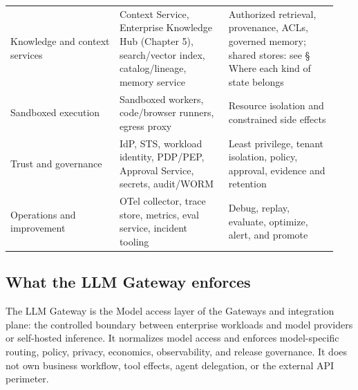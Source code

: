 \begin{longtable}{@{}Y{0.3133\linewidth}Y{0.3133\linewidth}Y{0.3133\linewidth}@{}}
Knowledge and context services & Context Service, Enterprise Knowledge Hub (Chapter 5), search/vector index, catalog/lineage, memory service & Authorized retrieval, provenance, ACLs, governed memory; shared stores: see § Where each kind of state belongs \\
Sandboxed execution & Sandboxed workers, code/browser runners, egress proxy & Resource isolation and constrained side effects \\
Trust and governance & IdP, STS, workload identity, PDP/PEP, Approval Service, secrets, audit/WORM & Least privilege, tenant isolation, policy, approval, evidence and retention \\
Operations and improvement & OTel collector, trace store, metrics, eval service, incident tooling & Debug, replay, evaluate, optimize, alert, and promote \\
\end{longtable}
\BookTableEnd

\subsection{What the LLM Gateway enforces}

The LLM Gateway is the Model access layer of the Gateways and integration plane: the controlled boundary between enterprise workloads and model providers or self-hosted inference. It normalizes model access and enforces model-specific routing, policy, privacy, economics, observability, and release governance. It does not own business workflow, tool effects, agent delegation, or the external API perimeter.\par

